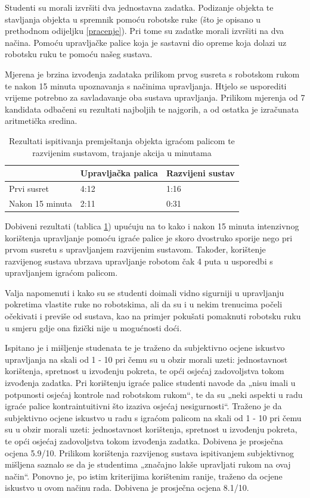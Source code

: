 \documentclass[times, utf8, diplomski, numeric]{fer}
\begin{document}
Studenti su morali izvršiti dva jednostavna zadatka. Podizanje objekta te stavljanja objekta u spremnik pomoću robotske ruke (što je opisano u prethodnom odijeljku \ref{pracenje}).
Pri tome su zadatke morali izvršiti na dva načina. Pomoću upravljačke palice koja je sastavni dio opreme koja dolazi uz robotsku ruku te pomoću našeg sustava.

Mjerena je brzina izvođenja zadataka prilikom prvog susreta s robotskom rukom te nakon 15 minuta upoznavanja s načinima upravljanja. Htjelo se usporediti vrijeme potrebno za savladavanje oba sustava upravljanja. Prilikom mjerenja od 7 kandidata odbačeni su rezultati najboljih te najgorih, a od ostatka je izračunata aritmetička sredina.


\begin{table}[h!]
    \centering
    \begin{tabular}{ | l | l | l |}
    \hline
     & Upravljačka palica&Razvijeni sustav\\ \hline
    Prvi susret & 4:12&1:16\\ \hline
    Nakon 15 minuta & 2:11&0:31\\ \hline
    \end{tabular}
    \caption{Rezultati ispitivanja premještanja objekta igraćom palicom te razvijenim sustavom, trajanje akcija u minutama} \label{ispitivanje-premjestanja}
\end{table}

Dobiveni rezultati (tablica \ref{ispitivanje-premjestanja}) upućuju na to kako i nakon 15 minuta intenzivnog korištenja upravljanje pomoću igraće palice je skoro dvostruko sporije nego pri prvom susretu s upravljanjem razvijenim sustavom. Također, korištenje razvijenog sustava ubrzava upravljanje robotom čak 4 puta u usporedbi s upravljanjem igraćom palicom.

Valja napomenuti i kako su se studenti doimali vidno sigurniji u upravljanju pokretima vlastite ruke no robotskima, ali da su i u nekim trenucima počeli očekivati i previše od sustava, kao na primjer pokušati pomaknuti robotsku ruku u smjeru gdje ona fizički nije u mogućnosti doći.

Ispitano je i mišljenje studenata te je traženo da subjektivno ocjene iskustvo upravljanja na skali od 1 - 10 pri čemu su u obzir morali uzeti: jednostavnost korištenja, spretnost u izvođenju pokreta, te opći osjećaj zadovoljstva tokom izvođenja zadatka.
Pri korištenju igraće palice studenti navode da „nisu imali u potpunosti osjećaj kontrole nad robotskom rukom“, te da su „neki aspekti u radu igraće palice kontraintuitivni što izaziva osjećaj nesigurnosti“. Traženo je da subjektivno ocjene iskustvo u radu s igraćom palicom na skali od 1 - 10 pri čemu su u obzir morali uzeti: jednostavnost korištenja, spretnost u izvođenju pokreta, te opći osjećaj zadovoljstva tokom izvođenja zadatka. Dobivena je prosječna ocjena 5.9/10.
Prilikom korištenja razvijenog sustava ispitivanjem subjektivnog mišljena saznalo se da je studentima „značajno lakše upravljati rukom na ovaj način“. Ponovno je, po istim kriterijima korištenim ranije, traženo da ocjene iskustvo u ovom načinu rada. Dobivena je prosječna ocjena 8.1/10.
\end{document}
